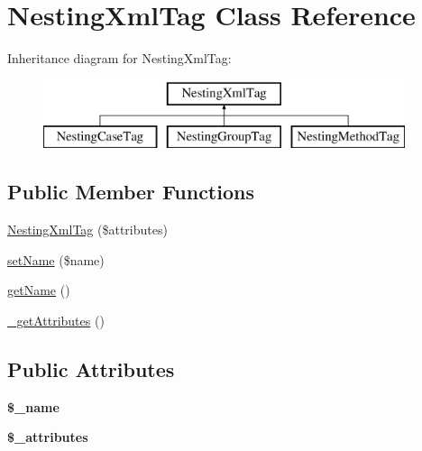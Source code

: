 \hypertarget{class_nesting_xml_tag}{
\section{NestingXmlTag Class Reference}
\label{class_nesting_xml_tag}
}
Inheritance diagram for NestingXmlTag:\begin{figure}[H]
\begin{center}
\leavevmode
\includegraphics[height=2.000000cm]{class_nesting_xml_tag}
\end{center}
\end{figure}
\subsection*{Public Member Functions}
\begin{DoxyCompactItemize}
\item 
\hyperlink{class_nesting_xml_tag_a0d2f0d6d0117c92b40b664d003dda596}{NestingXmlTag} (\$attributes)
\item 
\hyperlink{class_nesting_xml_tag_ae7fcd8fbe018cf263f09e4a4532dd429}{setName} (\$name)
\item 
\hyperlink{class_nesting_xml_tag_aea10453a4bf92a0133dcab1138ff6532}{getName} ()
\item 
\hyperlink{class_nesting_xml_tag_a4f77ec31908ff25ccf780aa1a6d648e2}{\_\-getAttributes} ()
\end{DoxyCompactItemize}
\subsection*{Public Attributes}
\begin{DoxyCompactItemize}
\item 
\hypertarget{class_nesting_xml_tag_a6d522b82e2849369d5c228ea2e4b885d}{
{\bfseries \$\_\-name}}
\label{class_nesting_xml_tag_a6d522b82e2849369d5c228ea2e4b885d}

\item 
\hypertarget{class_nesting_xml_tag_aab513b1b510d3addb7aa0ae695922a0e}{
{\bfseries \$\_\-attributes}}
\label{class_nesting_xml_tag_aab513b1b510d3addb7aa0ae695922a0e}

\end{DoxyCompactItemize}


